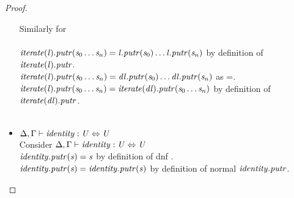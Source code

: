 \begin{lemma}
\begin{proof}
\begin{itemize}
Similarly for \LanguageOf{\RegexContext}{\Star{\RegexAlt}}\\\\
$\mathit{iterate(\mathit{l})}.\mathit{putr}(\mathit{s}_0\ldots\mathit{s}_n)=\mathit{l}.\mathit{putr}(\mathit{s}_0)\ldots\mathit{l}.\mathit{putr}(\mathit{s}_n)$ by definition of $\mathit{iterate(\mathit{l})}.\mathit{putr}$.\\
$\mathit{iterate(\mathit{l})}.\mathit{putr}(\mathit{s}_0\ldots\mathit{s}_n)=\mathit{dl}.\mathit{putr}(\mathit{s}_0)\ldots\mathit{dl}.\mathit{putr}(\mathit{s}_n)$ as \PutRightOf{\DNFLens}=\PutRightOf{\Lens}.\\
$\mathit{iterate(\mathit{l})}.\mathit{putr}(\mathit{s}_0\ldots\mathit{s}_n)=\mathit{iterate(\mathit{dl})}.\mathit{putr}(\mathit{s}_0\ldots\mathit{s}_n)$ by definition of $\mathit{iterate(\mathit{dl})}.\mathit{putr}$.\\
\\
\item$\Delta, \Gamma \vdash \mathit{identity} : \mathit{U} \Leftrightarrow \mathit{U}$\\
Consider $\Delta, \Gamma \vdash \mathit{identity} : \mathit{U} \Leftrightarrow \mathit{U}$\\
$\mathit{identity}.\mathit{putr}(\mathit{s})=\mathit{s}$ by definition of dnf \PutRightOf{\IdentityLens{}}.\\
$\mathit{identity}.\mathit{putr}(\mathit{s})=\mathit{identity}.\mathit{putr}(\mathit{s})$ by definition of normal $\mathit{identity}{}.\mathit{putr}$.
\end{itemize}
\end{proof}
\end{lemma}

